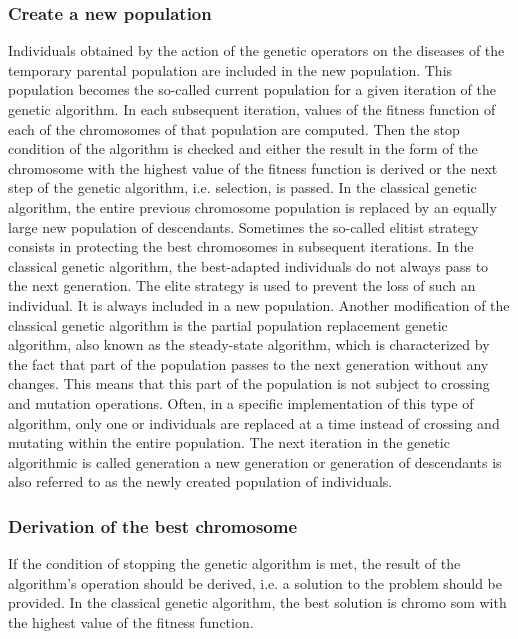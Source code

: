 \subsubsection{Create a new population}
Individuals obtained by the action of the genetic operators on the diseases of the 
temporary parental population are included in the new population. 
This population becomes the so-called current population for a given iteration of 
the genetic algorithm. 
In each subsequent iteration, values of the fitness function of each of the 
chromosomes of that population are computed. 
Then the stop condition of the algorithm is checked and either the result in 
the form of the chromosome with the highest value of the fitness function is derived 
or the next step of the genetic algorithm, i.e. selection, is passed. 
In the classical genetic algorithm, the entire previous chromosome population is 
replaced by an equally large new population of descendants. 
Sometimes the so-called elitist strategy consists in protecting the best 
chromosomes in subsequent iterations. 
In the classical genetic algorithm, the best-adapted individuals do not always 
pass to the next generation. 
The elite strategy is used to prevent the loss of such an individual. 
It is always included in a new population. Another modification of the classical 
genetic algorithm is the partial population replacement genetic algorithm, also 
known as the steady-state algorithm, which is characterized by the fact that 
part of the population passes to the next generation without any changes. 
This means that this part of the population is not subject to crossing and mutation 
operations. 
Often, in a specific implementation of this type of algorithm, only one or
individuals are replaced at a time instead of crossing and mutating within
the entire population. The next iteration in the genetic algorithmic is called 
generation a new generation or generation of descendants is also referred to as 
the newly created population of individuals.

\subsubsection{Derivation of the best chromosome} 
If the condition of stopping the genetic algorithm is met, the result of the 
algorithm's operation should be derived, i.e. a solution to the problem should 
be provided. 
In the classical genetic algorithm, the best solution is chromo som with the highest 
value of the fitness function.

